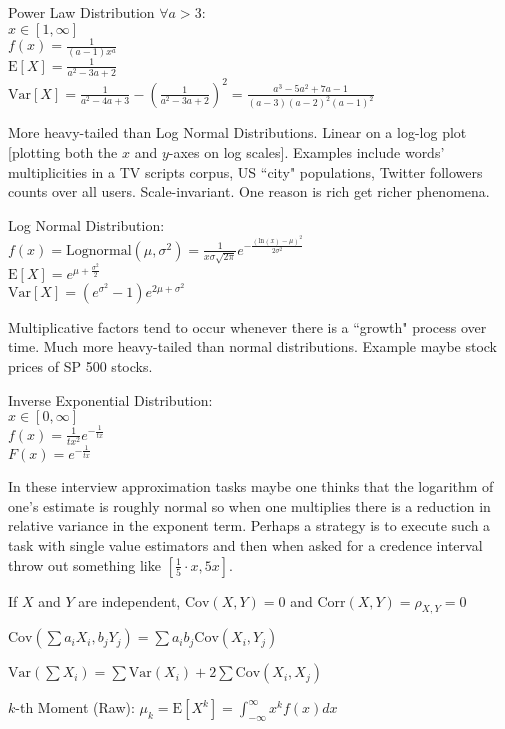 Power Law Distribution $\forall a>3$: \\
$x \in [1,\infty]$ \\
$f(x) = \frac{1}{(a - 1)x^{a}}$ \\
$\text{E}[X] = \frac{1}{a^2-3a+2}$ \\
$\text{Var}[X] = \frac{1}{a^2-4a+3}-\left(\frac{1}{a^2-3a+2} \right)^2=\frac{a^3-5a^2+7a-1}{(a-3)(a-2)^2(a-1)^2}$

More heavy-tailed than Log Normal Distributions. Linear on a log-log plot [plotting both the $x$ and $y$-axes on log scales]. Examples include words' multiplicities in a TV scripts corpus, US ``city" populations, Twitter followers counts over all users. Scale-invariant. One reason is rich get richer phenomena.

Log Normal Distribution: \\
$f(x) = \text{Lognormal}(\mu,\sigma^2)=\frac{1}{x\sigma \sqrt{2 \pi}}e^{-\frac{(\text{ln}(x)-\mu)^2}{2 \sigma^2}}$ \\
$\text{E}[X] = e^{\mu + \frac{\sigma^2}{2}}$ \\
$\text{Var}[X] = (e^{\sigma^2}-1)e^{2 \mu+\sigma^2}$

Multiplicative factors tend to occur whenever there is a ``growth" process over time. Much more heavy-tailed than normal distributions. Example maybe stock prices of SP 500 stocks.

Inverse Exponential Distribution: \\
$x \in [0,\infty]$ \\
$f(x) = \frac{1}{tx^2} e^{-\frac{1}{tx}}$ \\
$F(x) = e^{-\frac{1}{tx}}$

In these interview approximation tasks maybe one thinks that the logarithm of one's estimate is roughly normal so when one multiplies there is a reduction in relative variance in the exponent term. Perhaps a strategy is to execute such a task with single value estimators and then when asked for a credence interval throw out something like $\left[\frac{1}{5} \cdot x, 5x \right ]$.

If $X$ and $Y$ are independent, $\text{Cov}(X,Y)=0$ and $\text{Corr}(X,Y)=\rho_{X,Y}=0$

$\text{Cov}\left(\sum a_i X_i , b_j Y_j \right)=\sum a_i b_j \text{Cov}(X_i,Y_j)$

$\text{Var}\left(\sum X_i \right)=\sum \text{Var}(X_i) + 2 \sum \text{Cov}(X_i,X_j)$

$k$-th Moment (Raw): $\mu_k=\text{E}[X^k]=\int_{-\infty}^{\infty} x^k f(x) dx$

